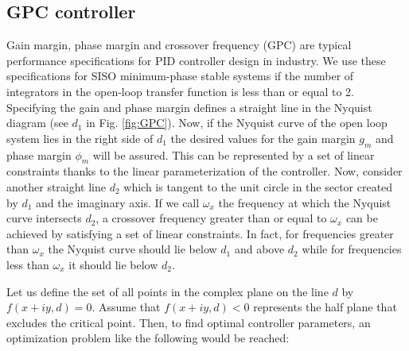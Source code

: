 \documentclass [12pt , a4paper] {article}
\begin{document}
\subsection{GPC controller}
Gain margin, phase margin and crossover frequency (GPC) are typical performance specifications for PID controller design in industry. We use these specifications for SISO minimum-phase stable systems if the number of integrators in the open-loop transfer function is less than or equal to 2. Specifying the gain and phase margin defines a straight line in the Nyquist diagram (see $d_1$ in Fig. \ref{fig:GPC}). Now, if the Nyquist curve of the open loop system lies in the right side of $d_1$ the desired values for the gain margin $g_m$ and phase margin $\phi_m$ will be assured. This can be represented by a set of linear constraints thanks to the linear parameterization of the controller. Now, consider another straight line $d_2$ which is tangent to the unit circle in the sector created by $d_1$ and the imaginary axis. If we call $\omega_x$ the frequency at which the Nyquist curve intersects $d_2$, a crossover frequency greater than or equal to $\omega_x$ can be achieved by satisfying a set of linear constraints. In fact, for frequencies greater than $\omega_x$ the Nyquist curve should lie below $d_1$ and above $d_2$ while for frequencies less than $\omega_x$ it should lie below $d_2$.

Let us define the set of all points in the complex plane on the line $d$ by $f(x+iy, d) = 0$. Assume that $f(x+iy, d) < 0$ represents the half plane that excludes the critical point. Then, to find optimal controller parameters, an optimization problem like the following would be reached:
\end{document}
